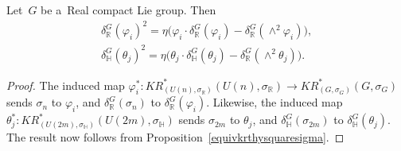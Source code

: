 \begin{Theorem}
\label{equivkrthysquare}
Let~$G$ be a~Real compact Lie group.
Then
\begin{gather}
\label{realsquare}
\delta_\mathbb{R}^G(\varphi_i)^2
=\eta\big(\varphi_i\cdot\delta_\mathbb{R}^G(\varphi_i)-\delta_\mathbb{R}^G(\wedge^2\varphi_i)\big),
\\
\label{quatsquare}
\delta_\mathbb{H}^G(\theta_j)^2
=\eta\big(\theta_j\cdot\delta_\mathbb{H}^G(\theta_j)-\delta_\mathbb{R}^G(\wedge^2\theta_j)\big).
\end{gather}
\end{Theorem}
\begin{proof}
The induced map $\varphi_i^*: KR^*_{(U(n),
\sigma_\mathbb{R})}(U(n),
\sigma_\mathbb{R})\to KR^*_{(G,
\sigma_G)}
(G,
\sigma_G)$ sends $\sigma_n$ to $\varphi_i$, and $\delta_\mathbb{R}^G(\sigma_n)$ to $\delta_\mathbb{R}^G(\varphi_i)$.
Likewise, the induced map $\theta_j^*: KR^*_{(U(2m),
\sigma_\mathbb{H})}(U(2m),
\sigma_\mathbb{H})$ sends $\sigma_{2m}$ to $\theta_j$, and $\delta_\mathbb{H}^G(\sigma_{2m})$ to $\delta_\mathbb{H}^G(\theta_j)$.
The result now follows from Proposition~\ref{equivkrthysquaresigma}.
\end{proof}

